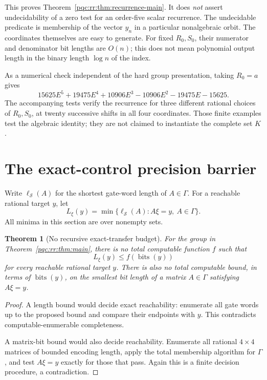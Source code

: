 \documentclass[11pt,letterpaper]{article}
\numberwithin{equation}{section}
\newtheorem{theorem}{Theorem}[section]
\theoremstyle{definition}
\theoremstyle{remark}
\newcommand{\bits}{\operatorname{bits}}
\newcommand{\srcmark}[1]{\par\noindent{\small\itshape [source~#1]}\par}
\begin{document}
This proves Theorem~\ref{pqc:rr:thm:recurrence-main}. It does \emph{not} assert
undecidability of a zero test for an order-five scalar recurrence. The
undecidable predicate is membership of the vector $y_n$ in a particular
nonalgebraic orbit. The coordinates themselves are easy to generate.
For fixed $R_0,S_0$, their numerator and denominator bit lengths are
$O(n)$; this does not mean polynomial output length in the binary length
$\log n$ of the index.

As a numerical check independent of the hard group presentation, taking
$R_0=a$ gives
\[
 15625E^5+19475E^4+10906E^3-10906E^2-19475E-15625.
\]
The accompanying tests verify the recurrence for three different rational
choices of $R_0,S_0$, at twenty successive shifts in all four coordinates.
Those finite examples test the algebraic identity; they are not claimed
to instantiate the complete set $K$.

\section{The exact-control precision barrier}
\label{pqc:rr:sec:bounds}
\srcmark{11}

Write $\ell_{\mathcal S}(A)$ for the shortest gate-word length of
$A\in\Gamma$. For a reachable rational target $y$, let
\[
 L_\xi(y)=\min\{\ell_{\mathcal S}(A):A\xi=y,\ A\in\Gamma\}.
\]
All minima in this section are over nonempty sets.

\begin{theorem}[No recursive exact-transfer budget]\label{pqc:rr:thm:nobound}
For the group in Theorem~\ref{pqc:rr:thm:main}, there is no total computable
function $f$ such that
\[
 L_\xi(y)\leq f(\bits(y))
\]
for every reachable rational target $y$. There is also no total computable
bound, in terms of $\bits(y)$, on the smallest bit length of a matrix
$A\in\Gamma$ satisfying $A\xi=y$.
\end{theorem}
\begin{proof}
A length bound would decide exact reachability: enumerate all gate words
up to the proposed bound and compare their endpoints with $y$. This
contradicts computable-enumerable completeness.

A matrix-bit bound would also decide reachability. Enumerate all rational
$4\times4$ matrices of bounded encoding length, apply the total membership
algorithm for $\Gamma$, and test $A\xi=y$ exactly for those that pass.
Again this is a finite decision procedure, a contradiction.
\end{proof}
\end{document}
